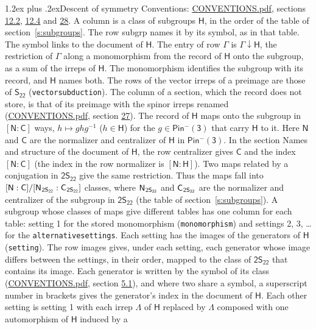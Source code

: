 \documentclass[10pt,a4paper]{article}
\makeatletter
\renewcommand\section{\@startsection{section}{1}{\z@}{-3ex plus -1ex minus -.2ex}%
  {1.2ex plus .2ex}{\normalfont\large\sffamily\bfseries\color{parttitle}}}
\numberwithin{equation}{section}
\newcommand{\grp}[1]{\mathsf{#1}}
\newcommand{\grpindex}[2]{[#1 : #2]}
\newcommand{\restr}[2]{#1\!\downarrow#2}
\newcommand{\hairsp}{\mkern1mu}
\makeatother
\begin{document}
\section{Descent of symmetry}\label{s:subduction}
Conventions: \href{../../CONVENTIONS.pdf}{CONVENTIONS.pdf}, sections \href{../../../rotation/CONVENTIONS.pdf\#conv.12.2}{12.2}, \href{../../../rotation/CONVENTIONS.pdf\#conv.12.4}{12.4} and \href{../../CONVENTIONS.pdf\#conv.28}{28}.
A column is a class of subgroups $\grp{H}$, in the order of the table of section~\ref{s:subgroups}. The row subgrp names it by its symbol, as in that table. The symbol links to the document of $\grp{H}$. The entry of row $\Gamma$ is $\restr{\Gamma}{\grp{H}}$, the restriction of $\Gamma$ along a monomorphism from the record of $\grp{H}$ onto the subgroup, as a sum of the irreps of $\grp{H}$. The monomorphism identifies the subgroup with its record, and $\grp{H}$ names both. The rows of the vector irreps of a preimage are those of \href{../../../rotation/data/pdf/S22.pdf}{$\grp{S_{22}}$} (\texttt{vectorsubduction}). The column of a section, which the record does not store, is that of its preimage with the spinor irreps renamed (\href{../../CONVENTIONS.pdf}{CONVENTIONS.pdf}, section \href{../../CONVENTIONS.pdf\#conv.27}{27}). \label{n:group.normalizer.o3}\label{n:group.centralizer.o3}\label{n:element.h}The record of $\grp{H}$ maps onto the subgroup in $\grpindex{\grp{N}}{\grp{C}}$ ways, $h \mapsto g h g^{-1}$ ($h \in \grp{H}$) for the $g \in \grp{Pin^{-}(3)}$ that carry $\grp{H}$ to it. Here $\grp{N}$ and $\grp{C}$ are the normalizer and centralizer of $\grp{H}$ in \href{Pinminus3.pdf}{$\grp{Pin^{-}(3)}$}. In the section Names and structure of the document of $\grp{H}$, the row centralizer gives $\grp{C}$ and the index $\grpindex{\grp{N}}{\grp{C}}$ (the index in the row normalizer is $\grpindex{\grp{N}}{\grp{H}}$). Two maps related by a conjugation in $\grp{2S_{22}}$ give the same restriction. Thus the maps fall into $\grpindex{\grp{N}}{\grp{C}}/\grpindex{\grp{N}_{\hairsp \grp{2S_{22}}}}{\grp{C}_{\hairsp \grp{2S_{22}}}}$ classes, where $\grp{N}_{\hairsp \grp{2S_{22}}}$ and $\grp{C}_{\hairsp \grp{2S_{22}}}$ are the normalizer and centralizer of the subgroup in $\grp{2S_{22}}$ (the table of section~\ref{s:subgroups}). \label{n:head.setting}A subgroup whose classes of maps give different tables has one column for each table: setting 1 for the stored monomorphism (\texttt{monomorphism}) and settings 2, 3, \dots{} for the \texttt{alternativesettings}. Each setting has the images of the generators of $\grp{H}$ (\texttt{setting}). \label{n:head.images}The row images gives, under each setting, each generator whose image differs between the settings, in their order, mapped to the class of $\grp{2S_{22}}$ that contains its image. Each generator is written by the symbol of its class (\href{../../CONVENTIONS.pdf}{CONVENTIONS.pdf}, section \href{../../../rotation/CONVENTIONS.pdf\#conv.5.1}{5.1}), and where two share a symbol, a superscript number in brackets gives the generator's index in the document of $\grp{H}$. \label{n:irrep.Delta}Each other setting is setting 1 with each irrep $\Lambda$ of $\grp{H}$ replaced by $\Lambda$ composed with one automorphism of $\grp{H}$ induced by a 
\end{document}
